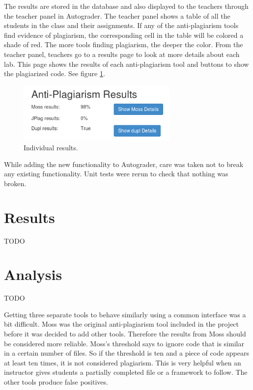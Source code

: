 \documentclass[journal,comsoc]{IEEEtran}
\begin{document}
		The results are stored in the database and also displayed to the teachers through the teacher panel in Autograder. The teacher panel shows a table of all the students in the class and their assignments. If any of the anti-plagiarism tools find evidence of plagiarism, the corresponding cell in the table will be colored a shade of red. The more tools finding plagiarism, the deeper the color. From the teacher panel, teachers go to a results page to look at more details about each lab. This page shows the results of each anti-plagiarism tool and buttons to show the plagiarized code. See figure \ref{fig:indResults}.
		
		\begin{figure}[h!]
			\includegraphics[width=0.7\textwidth]{IndividualResults.png}
			\caption{Individual results.}
			\label{fig:indResults}
		\end{figure}
		
		While adding the new functionality to Autograder, care was taken not to break any existing functionality. Unit tests were rerun to check that nothing was broken.
	
	\section{Results}
	TODO
	
	\section{Analysis}
	TODO
	
	Getting three separate tools to behave similarly using a common interface was a bit difficult. Moss was the original anti-plagiarism tool included in the project before it was decided to add other tools. Therefore the results from Moss should be considered more reliable. Moss's threshold says to ignore code that is similar in a certain number of files. So if the threshold is ten and a piece of code appears at least ten times, it is not considered plagiarism. This is very helpful when an instructor gives students a partially completed file or a framework to follow. The other tools produce false positives.
	
\end{document}
